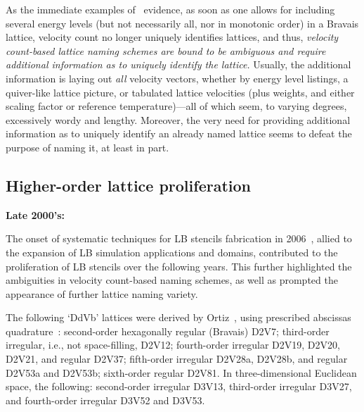     As the immediate examples of~\cite{2006-PhilippiPC+SurmasR-PhysRevE} evidence, as soon as one allows for  including  several
    energy levels (but not necessarily all, nor in monotonic order) in a Bravais lattice,  velocity  count  no  longer  uniquely
    identifies lattices, and thus, \emph{velocity count-based lattice naming schemes are  bound  to  be  ambiguous  and  require
    additional information as to uniquely identify the lattice.\/} Usually, the additional information is laying out  \emph{all}
    velocity vectors, whether by energy level listings, a quiver-like lattice picture, or  tabulated  lattice  velocities  (plus
    weights, and either scaling factor or reference temperature)---all of which seem, to varying degrees, excessively wordy  and
    lengthy. Moreover, the very need for providing additional information as to uniquely identify an already named lattice seems
    to defeat the purpose of naming it, at least in part.

    \subsection{Higher-order lattice proliferation}


    \vspace{2.0mm}\noindent\textbf{Late 2000's:}\vspace{1.0mm}

    The onset of systematic techniques  for  LB  stencils  fabrication  in  2006~\cite{2006-ChikatamarlaSS+KarlinIV-PhysRevLett,
    2006-PhilippiPC+SurmasR-PhysRevE, 2006-ShanX+ChenH-JFluidMech}, allied to the expansion of LB  simulation  applications  and
    domains, contributed to the proliferation of LB stencils over the following years. This further highlighted the  ambiguities
    in velocity count-based naming schemes, as well as prompted the appearance of further lattice naming variety.

    The  following  `DdVb'  lattices   were   derived   by   Ortiz~\cite{2007-OrtizCEP-DrUFSC},   using   prescribed   abscissas
    quadrature~\cite{2006-PhilippiPC+SurmasR-PhysRevE}: second-order hexagonally regular (Bravais) D2V7; third-order  irregular,
    i.e., not space-filling, D2V12; fourth-order irregular D2V19, D2V20, D2V21, and regular D2V37; fifth-order irregular D2V28a,
    D2V28b, and regular D2V53a and D2V53b; sixth-order regular D2V81.  In  three-dimensional  Euclidean  space,  the  following:
    second-order irregular D3V13, third-order irregular D3V27, and fourth-order irregular D3V52 and D3V53.

